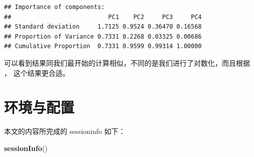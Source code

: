 \documentclass[
]{krantz}
\makeatletter
\newenvironment{Shaded}{\begin{snugshade}}{\end{snugshade}}
\newcommand{\KeywordTok}[1]{\textcolor[rgb]{0.13,0.29,0.53}{\textbf{#1}}}
\newcommand{\NormalTok}[1]{#1}
\newenvironment{kframe}{%
\medskip{}
\setlength{\fboxsep}{.8em}
 \def\at@end@of@kframe{}%
 \ifinner\ifhmode%
  \def\at@end@of@kframe{\end{minipage}}%
  \begin{minipage}{\columnwidth}%
 \fi\fi%
 \def\FrameCommand##1{\hskip\@totalleftmargin \hskip-\fboxsep
 \colorbox{shadecolor}{##1}\hskip-\fboxsep
     \hskip-\linewidth \hskip-\@totalleftmargin \hskip\columnwidth}%
 \MakeFramed {\advance\hsize-\width
   \@totalleftmargin\z@ \linewidth\hsize
   \@setminipage}}%
 {\par\unskip\endMakeFramed%
 \at@end@of@kframe}
\renewenvironment{Shaded}{\begin{kframe}}{\end{kframe}}
\makeatother
\begin{document}
\begin{verbatim}
## Importance of components:
##                           PC1    PC2     PC3     PC4
## Standard deviation     1.7125 0.9524 0.36470 0.16568
## Proportion of Variance 0.7331 0.2268 0.03325 0.00686
## Cumulative Proportion  0.7331 0.9599 0.99314 1.00000
\end{verbatim}

可以看到结果同我们最开始的计算相似，不同的是我们进行了对数化，而且根据 \citet{kemp2003modern}， 这个结果更合适。

\hypertarget{sessioninfo}{%
\chapter{环境与配置}\label{sessioninfo}}

本文的内容所完成的 sessioninfo 如下：

\begin{Shaded}
\begin{Highlighting}[]
\KeywordTok{sessionInfo}\NormalTok{()}
\end{Highlighting}
\end{Shaded}
\end{document}
